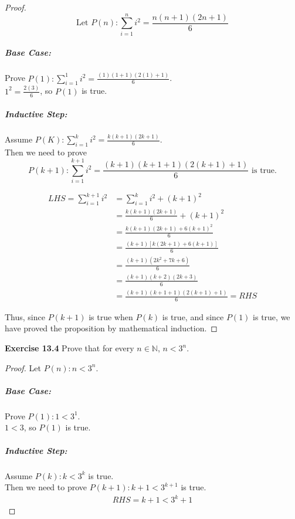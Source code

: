 \documentclass[12pt,oneside]{article}
\newenvironment{exercise}[1]{\vspace{.1in}\noindent\textbf{Exercise #1 \hspace{.05em}}}{}
\newcommand{\N}{\mathbb{N}}
\begin{document}
\begin{proof}


\begin{equation*}
\text{Let~} P(n): \sum_{i=1}^n i^2 = \frac{n(n+1)(2n+1)}{6}
\end{equation*}

\subparagraph*{Base Case:}
Prove $P(1): \sum_{i=1}^1 i^2 = \frac{(1)(1+1)(2(1)+1)}{6}$.\\
$1^2 = \frac{2(3)}{6}$, so $P(1)$ is true.

\subparagraph*{Inductive Step:}
Assume $P(K): \sum_{i=1}^k i^2 = \frac{k(k+1)(2k+1)}{6}$.\\
Then we need to prove
\begin{equation*}
P(k+1): \sum_{i=1}^{k+1} i^2 = \frac{(k+1)(k+1+1)(2(k+1)+1)}{6} \text{~is true.}
\end{equation*}


\begin{align*}
\textit{LHS} = \sum_{i=1}^{k+1} i^2 &= \sum_{i=1}^k i^2+(k+1)^2 \\
&= \frac{k(k+1)(2k+1)}{6}+(k+1)^2 \\
&= \frac{k(k+1)(2k+1)+6(k+1)^2}{6} \\
&= \frac{(k+1)[k(2k+1)+6(k+1)]}{6} \\
&= \frac{(k+1)(2k^2+7k+6)}{6} \\
&= \frac{(k+1)(k+2)(2k+3)}{6} \\
&= \frac{(k+1)(k+1+1)(2(k+1)+1)}{6} = \textit{RHS}
\end{align*}

Thus, since $P(k+1)$ is true when $P(k)$ is true, and since $P(1)$ is true, we have proved the proposition by mathematical induction.
\end{proof}

\begin{exercise}{13.4}
Prove that for every $n \in \N$, $n < 3^n$.
\end{exercise}

\begin{proof}
Let $P(n): n < 3^n$.

\subparagraph*{Base Case:}
Prove $P(1): 1 < 3^1$. \\
$1 < 3$, so $P(1)$ is true.

\subparagraph*{Inductive Step:}
Assume $P(k): k < 3^k$ is true. \\
Then we need to prove $P(k+1): k+1 < 3^{k+1}$ is true. \\

\begin{align*}
\textit{RHS} = k+1 < 3^k+1
\end{align*}
\end{proof}
\end{document}
